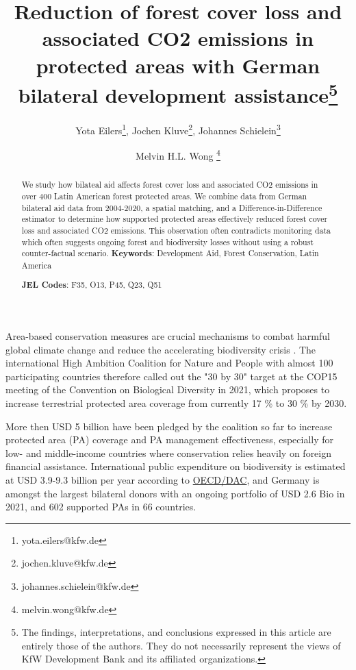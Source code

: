 \documentclass{article}
\title{Reduction of forest cover loss and associated CO2 emissions in protected areas with German bilateral development assistance\thanks{The findings, interpretations, and conclusions expressed in this article are entirely those of the authors. They do not necessarily represent the views of KfW Development Bank and its affiliated organizations.}}
\author{Yota Eilers\thanks{yota.eilers@kfw.de}, Jochen Kluve\thanks{jochen.kluve@kfw.de}, Johannes Schielein\thanks{johannes.schielein@kfw.de} \and Melvin H.L. Wong \thanks{melvin.wong@kfw.de}}
\begin{document}
%
\maketitle
\begin{abstract}
We study how bilateal aid affects forest cover loss and associated CO2 emissions in over 400 Latin American forest protected areas. We combine data from German bilateral aid data from 2004-2020, a spatial matching, and a Difference-in-Difference estimator to determine how supported protected areas effectively reduced forest cover loss and associated CO2 emissions. This observation often contradicts monitoring data which often suggests ongoing forest and biodiversity losses without using a robust counter-factual scenario.
                               \vspace{0.5cm}
                               \noindent\textbf{Keywords}: Development Aid, Forest Conservation, Latin America%
                               
                               \textbf{JEL Codes}: F35, O13, P45, Q23, Q51
                               
                               \vspace{0.5cm}
                \end{abstract}
                
                
                


Area-based conservation measures are crucial mechanisms to combat harmful global climate change and reduce the accelerating biodiversity crisis \citep{shukla2019climate, diaz2019global}. The international  High Ambition Coalition for Nature and People with almost 100 participating countries therefore called out the "30 by 30" target at the COP15 meeting of the Convention on Biological Diversity in 2021, which proposes to increase terrestrial protected area coverage from currently 17 \% to 30 \% by 2030.

More then USD 5 billion have been pledged by the coalition so far to increase protected area (PA) coverage and PA management effectiveness, especially for low- and middle-income countries where conservation relies heavily on foreign financial assistance. International public expenditure on biodiversity is estimated at USD 3.9-9.3 billion per year according to \href{https://www.oecd.org/environment/resources/biodiversity/report-a-comprehensive-overview-of-global-biodiversity-finance.pdf}{OECD/DAC}, and Germany is amongst the largest bilateral donors with an ongoing portfolio of USD 2.6 Bio in 2021, and 602 supported PAs in 66 countries.
\end{document}
